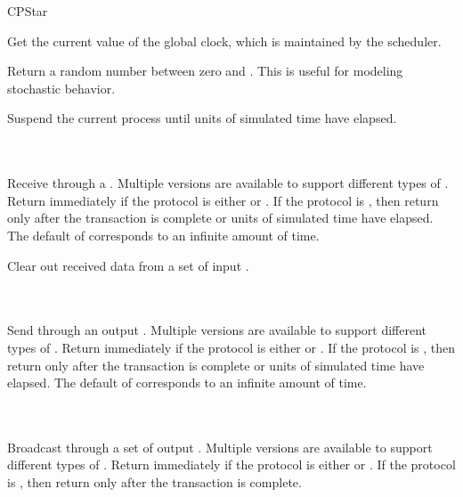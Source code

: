 \begin{indexlist}{CPStar}

Get the current value of the global clock, which is maintained by the
scheduler.

Return a random number between zero and .  This is useful for
modeling stochastic behavior.

Suspend the current process until  units of simulated time
have elapsed.

 \\
 \\
Receive  through a .  Multiple versions are
available to support different types of .  Return immediately
if the protocol is either  or .  If the
protocol is , then return only after the transaction is
complete or  units of simulated time have elapsed.  The
default  of  corresponds to an infinite amount of
time.

Clear out received data from a set of input .

 \\
 \\
Send  through an output .  Multiple versions are
available to support different types of .  Return immediately
if the protocol is either  or .  If the
protocol is , then return only after the transaction is
complete or  units of simulated time have elapsed.  The
default  of  corresponds to an infinite amount of
time.

 \\
 \\
Broadcast  through a set of output .  Multiple
versions are available to support different types of .  Return
immediately if the protocol is either  or
.  If the protocol is , then return only after
the transaction is complete.


\end{indexlist}
